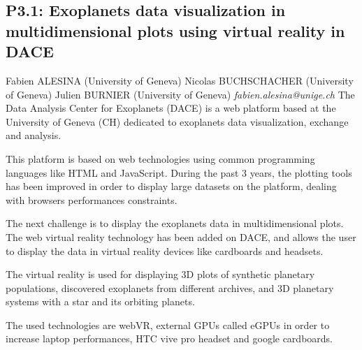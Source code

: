 \documentclass{report}
\begin{document}
\subsection*{P3.1: Exoplanets data visualization in multidimensional plots using virtual reality in DACE}
\bigskip
Fabien ALESINA (University of Geneva) \newline Nicolas BUCHSCHACHER (University of Geneva) \newline  Julien BURNIER (University of Geneva)\newline   \newline  \newline  \newline\newline
{\it fabien.alesina@unige.ch}\newline
\newline\newline
The Data Analysis Center for Exoplanets (DACE) is a web platform based at the University of Geneva (CH) dedicated to exoplanets data visualization, exchange and analysis.

This platform is based on web technologies using common programming languages like HTML and JavaScript. During the past 3 years, the plotting tools has been improved in order to display large datasets on the platform, dealing with browsers performances constraints.

The next challenge is to display the exoplanets data in multidimensional plots. The web virtual reality technology has been added on DACE, and allows the user to display the data in virtual reality devices like cardboards and headsets. 

The virtual reality is used for displaying 3D plots of synthetic planetary populations, discovered exoplanets from different archives, and 3D planetary systems with a star and its orbiting planets.

The used technologies are webVR, external GPUs called eGPUs in order to increase laptop performances, HTC vive pro headset and google cardboards.\newline
\newpage
\end{document}
